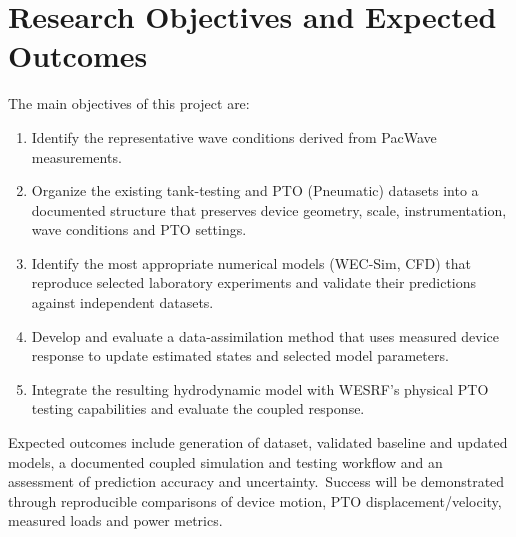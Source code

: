 \documentclass[11pt]{article}
\begin{document}
\section{Research Objectives and Expected Outcomes}
The main objectives of this project are:
\begin{enumerate}[noitemsep]
    \item Identify the representative wave conditions derived from PacWave measurements.
    \item Organize the existing tank-testing and PTO (Pneumatic) datasets into a documented structure that preserves device geometry, scale, instrumentation, wave conditions and PTO settings.
    \item Identify the most appropriate numerical models (WEC-Sim, CFD) that reproduce selected laboratory experiments and validate their predictions against independent datasets. 
    \item Develop and evaluate a data-assimilation method that uses measured device response to update estimated states and selected model parameters. 
    \item Integrate the resulting hydrodynamic model with WESRF’s physical PTO testing capabilities and evaluate the coupled response. 
\end{enumerate}
Expected outcomes include generation of dataset, validated baseline and updated models, a documented coupled simulation and testing workflow and an assessment of prediction accuracy and uncertainty.~Success will be demonstrated through reproducible comparisons of device motion, PTO displacement/velocity, measured loads and power metrics.
\end{document}
